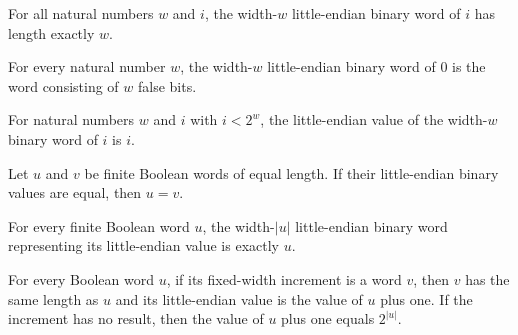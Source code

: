 \begin{lemma}
\label{Complexity.enumWord_length}
\leanok
{}
For all natural numbers $w$ and $i$, the width-$w$ little-endian binary word of $i$ has
length exactly $w$.
\end{lemma}

\begin{lemma}
\label{Complexity.enumWord_zero}
\leanok
{}
For every natural number $w$, the width-$w$ little-endian binary word of $0$ is the word
consisting of $w$ false bits.
\end{lemma}

\begin{lemma}
\label{Complexity.enumWord_value}
\leanok
{}
For natural numbers $w$ and $i$ with $i<2^w$, the little-endian value of the width-$w$
binary word of $i$ is $i$.
\end{lemma}

\begin{lemma}
\label{Complexity.enumValue_injective}
\leanok
{}
Let $u$ and $v$ be finite Boolean words of equal length. If their little-endian binary
values are equal, then $u=v$.
\end{lemma}

\begin{lemma}
\label{Complexity.enumWord_complete}
\leanok
{}
For every finite Boolean word $u$, the width-$|u|$ little-endian binary word
representing its little-endian value is exactly $u$.
\end{lemma}

\begin{lemma}
\label{Complexity.enumInc_spec}
\leanok
{}
For every Boolean word $u$, if its fixed-width increment is a word $v$, then $v$ has the
same length as $u$ and its little-endian value is the value of $u$ plus one. If the
increment has no result, then the value of $u$ plus one equals $2^{|u|}$.
\end{lemma}

